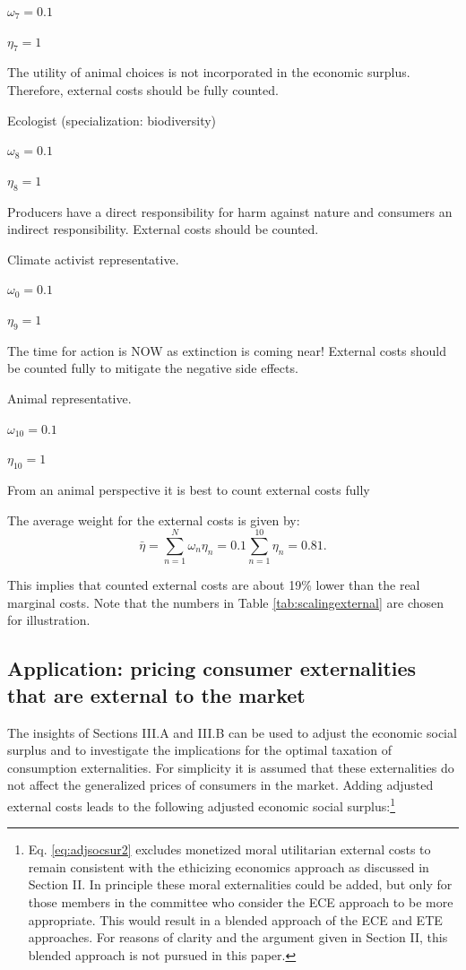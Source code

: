 \documentclass[
]{book}
\begin{document}
\(\omega_7 = 0.1\)

\(\eta_7 = 1\)

The utility of animal choices is not incorporated in the economic surplus. Therefore, external costs should be fully counted.

Ecologist (specialization: biodiversity)

\(\omega_8 = 0.1\)

\(\eta_8 = 1\)

Producers have a direct responsibility for harm against nature and consumers an indirect responsibility. External costs should be counted.

Climate activist representative.

\(\omega_0 = 0.1\)

\(\eta_9 = 1\)

The time for action is NOW as extinction is coming near! External costs should be counted fully to mitigate the negative side effects.

Animal representative.

\(\omega_{10} = 0.1\)

\(\eta_{10} = 1\)

From an animal perspective it is best to count external costs fully

The average weight for the external costs is given by:
\begin{equation}
 \bar{\eta} = \sum_{n=1}^N \omega_n \eta_n = 0.1 \sum_{n=1}^{10} \eta_n = 0.81.
\end{equation}

This implies that counted external costs are about 19\% lower than the real marginal costs. Note that the numbers in Table \ref{tab:scalingexternal} are chosen for illustration.

\hypertarget{application-pricing-consumer-externalities-that-are-external-to-the-market}{%
\subsection{Application: pricing consumer externalities that are external to the market}\label{application-pricing-consumer-externalities-that-are-external-to-the-market}}

The insights of Sections III.A and III.B can be used to adjust the economic social surplus and to investigate the implications for the optimal taxation of consumption externalities. For simplicity it is assumed that these externalities do not affect the generalized prices of consumers in the market. Adding adjusted external costs leads to the following adjusted economic social surplus:\footnote{Eq. \eqref{eq:adjsocsur2} excludes monetized moral utilitarian external costs to remain consistent with the ethicizing economics approach as discussed in Section II. In principle these moral externalities could be added, but only for those members in the committee who consider the ECE approach to be more appropriate. This would result in a blended approach of the ECE and ETE approaches. For reasons of clarity and the argument given in Section II, this blended approach is not pursued in this paper.}
\end{document}
